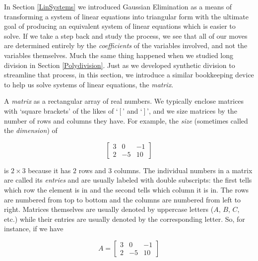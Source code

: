 \documentclass{ximera}
\begin{document}
	\author{Stitz-Zeager}




\setcounter{footnote}{0}

\label{AugMatrices}

\setlength{\extrarowheight}{0pt}

In Section \ref{LinSystems} we introduced Gaussian Elimination as a means of transforming a system of linear equations into triangular form with the ultimate goal of producing an equivalent system of linear equations which is easier to solve.  If we take a step back and study the process, we see that all of our moves are determined entirely by the \textit{coefficients} of the variables involved, and not the variables themselves.  Much the same thing happened when we studied long division in Section \ref{Polydivision}. Just as we developed synthetic division to streamline that process, in this section, we introduce a similar bookkeeping device to help us solve systems of linear equations, the \textit{matrix}. 

A \textit{matrix} as a rectangular array of real numbers.  We typically enclose matrices with `square brackets' of the likes of  `$\left[ \right.$' and `$\left. \right]$', and we size matrices by the number of rows and columns they have.  For example, the  \textit{size} (sometimes called the \textit{dimension}) of 

\[ \left[ \begin{array}{rrr} 3 & 0 & -1 \\ 
2 & -5 & 10 \end{array} \right]\] 

is  $2 \times 3$  because it has $2$ rows and $3$ columns.  The individual numbers in a matrix are called its   \textit{entries} and are usually labeled with double subscripts: the first tells which row the element is in and the second tells which column it is in.  The rows are numbered from top to bottom and the columns are numbered from left to right.  Matrices themselves are usually denoted by uppercase letters ($A$, $B$, $C$, etc.) while their entries are usually denoted by the corresponding letter.  So, for instance, if we have 

\[ A = \left[ \begin{array}{rrr} 3 & 0 & -1 \\ 
2 & -5 & 10 \end{array} \right]\] 
\end{document}
